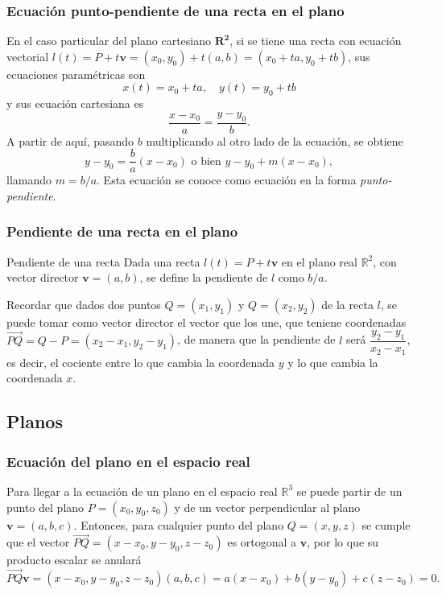 \begin{frame}
\frametitle{Ecuación punto-pendiente de una recta en el plano}
En el caso particular del plano cartesiano $\mathbf{R^2}$, si se tiene una recta con ecuación vectorial $l(t)=P+t\mathbf{v}=(x_0,y_0)+t(a,b) = (x_0+ta,y_0+tb)$, sus ecuaciones paramétricas son
\[
x(t)=x_0+ta,\quad y(t)=y_0+tb
\]
y sus ecuación cartesiana es
\[
\frac{x-x_0}{a} = \frac{y-y_0}{b}.
\]  
A partir de aquí, pasando $b$ multiplicando al otro lado de la ecuación, se obtiene 
\[
y-y_0 = \frac{b}{a}(x-x_0) \mbox{ o bien } y-y_0+m(x-x_0),
\]
llamando $m=b/a$. Esta ecuación se conoce como ecuación en la forma \emph{punto-pendiente}.
 
\end{frame} 


\begin{frame}
\frametitle{Pendiente de una recta en el plano}
\begin{definicion}{Pendiente de una recta}
Dada una recta $l(t)=P+t\mathbf{v}$ en el plano real $\mathbb{R}^2$, con vector director $\mathbf{v}=(a,b)$, se define la pendiente de $l$ como $b/a$.
\end{definicion}

Recordar que dados dos puntos $Q=(x_1,y_1)$ y $Q=(x_2,y_2)$ de la recta $l$, se puede tomar como vector director el vector que los une, que teniene coordenadas $\vec{PQ}=Q-P=(x_2-x_1,y_2-y_1)$, de manera que la pendiente de $l$ será 
$\dfrac{y_2-y_1}{x_2-x_1}$, es decir, el cociente entre lo que cambia la coordenada $y$ y lo que cambia la coordenada $x$.

\begin{center}
\scalebox{0.7}{}
\end{center}
\end{frame} 



\subsection{Planos}
\begin{frame}
\frametitle{Ecuación del plano en el espacio real}
Para llegar a la ecuación de un plano en el espacio real $\mathbb{R}^3$ se puede partir de un punto del plano $P=(x_0,y_0,z_0)$ y de un vector perpendicular al plano $\mathbf{v}=(a,b,c)$. 
Entonces, para cualquier punto del plano $Q=(x,y,z)$ se cumple que el vector $\vec{PQ} = (x-x_0,y-y_0,z-z_0)$ es ortogonal a $\mathbf{v}$, por lo que su producto escalar se anulará
\[
\vec{PQ}\mathbf{v} = (x-x_0,y-y_0,z-z_0)(a,b,c) = a(x-x_0)+b(y-y_0)+c(z-z_0) = 0.
\]

\begin{center}
\scalebox{0.8}{}
\end{center}
\end{frame} 




